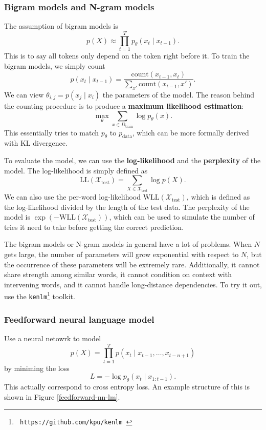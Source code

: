 \documentclass[a4paper]{article}
\begin{document}
\subsubsection{Bigram models and N-gram models} 
The assumption of bigram models is 
\[
p(X) \approx \prod_{t=1}^T p_\theta(x_{t} \mid x_{t - 1}).
\]
This is to say all tokens only depend on the token right 
before it. To train the bigram models, we simply count 
\[
p(x_t \mid x_{t - 1}) = \frac{\text{count} (x_{t-1}, x_t)}
{\sum_{x'} \text{count}(x_{t-1}, x')}.
\]
We can view $\theta_{i, j} = p(x_j \mid x_i)$ the 
parameters of the model. The reason behind the 
counting procedure is to produce a \textbf{maximum 
likelihood estimation}: 
\[
\max_{\theta} \sum_{x \in D_{\text{train}}} 
\log p_\theta(x).
\]
This essentially tries to match $p_\theta$ to $p_{\text{data}}$,
which can be more formally derived with KL divergence.

To evaluate the model, we can use the \textbf{log-likelihood}
and the \textbf{perplexity} of the model. The log-likelihood 
is simply defined as 
\[
  \mathrm{LL}(\mathcal{X}_{\text{test}}) 
  = \sum_{X \in \mathcal{X}_{\text{test}}} \log p(X).
\]
We can also use the per-word log-likelihood 
$\mathrm{WLL}(\mathcal{X}_{\text{test}})$,
which is defined as the log-likelihood divided by the 
length of the test data.
The perplexity of the model is 
$\exp \left( -\mathrm{WLL(\mathcal{X}_{\text{test}})} \right)$,
which can be used to simulate the number of tries it need to 
take before getting the correct prediction.

The bigram models or N-gram models in general have a lot of problems.
When $N$ gets large, the number of parameters will grow 
exponential with respect to $N$, but the occurrence of these 
parameters will be extremely rare.
Additionally, it cannot share strength among similar words, 
it cannot condition on context with intervening words, 
and it cannot handle long-distance dependencies. 
To try it out, use the 
\texttt{kenlm}\footnote{\texttt{
  https://github.com/kpu/kenlm
}} toolkit.

\subsubsection{Feedforward neural language model}
Use a neural netowrk to model 
\[
p(X) = \prod_{t = 1}^{T} p(x_t \mid x_{t-1}, \dots, x_{t-n+1})
\]
by miniming the loss 
\[
L = - \log p_\theta (x_t \mid x_{1 : t - 1}).
\]
This actually correspond to cross entropy loss.
An example structure of this is shown in Figure 
\ref{feedforward-nn-lm}.
\end{document}
